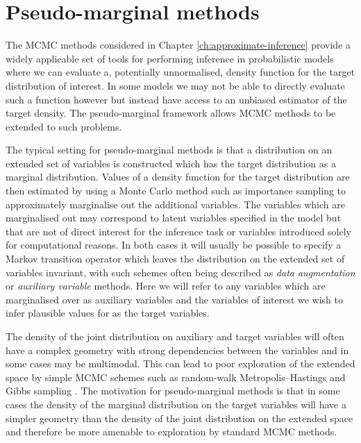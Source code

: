 \chapter{Pseudo-marginal methods}\label{ch:pseudo-marginal-methods}

The \ac{MCMC} methods considered in Chapter \ref{ch:approximate-inference} provide a widely applicable set of tools for performing inference in probabilistic models where we can evaluate a, potentially unnormalised, density function for the target distribution of interest. In some models we may not be able to directly evaluate such a function however but instead have access to an unbiased estimator of the target density. The pseudo-marginal framework \citep{andrieu2009pseudo} allows \ac{MCMC} methods to be extended to such problems.

The typical setting for pseudo-marginal methods is that a distribution on an extended set of variables is constructed which has the target distribution as a marginal distribution. Values of a density function for the target distribution are then estimated by using a Monte Carlo method such as importance sampling to approximately marginalise out the additional variables. The variables which are marginalised out may correspond to latent variables specified in the model but that are not of direct interest for the inference task or variables introduced solely for computational reasons. In both cases it will usually be possible to specify a Markov transition operator which leaves the distribution on the extended set of variables invariant, with such schemes often being described as \emph{data augmentation} \citep{tanner1987calculation,van2001art} or \emph{auxiliary variable}  \citep{edwards1988generalization,higdon1998auxiliary} methods. Here we will refer to any variables which are marginalised over as auxiliary variables and the variables of interest we wish to infer plausible values for as the target variables.

The density of the joint distribution on auxiliary and target variables will often have a complex geometry with strong dependencies between the variables and in some cases may be multimodal. This can lead to poor exploration of the extended space by simple \ac{MCMC} schemes such as random-walk Metropolis--Hastings and Gibbs sampling \citep{andrieu2009pseudo}. The motivation for pseudo-marginal methods is that in some cases the density of the marginal distribution on the target variables will have a simpler geometry than the density of the joint distribution on the extended space and therefore be more amenable to exploration by standard \ac{MCMC} methods. 


